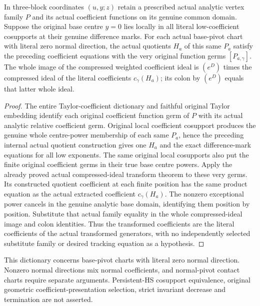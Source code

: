 \begin{theorem}
\label{hir:actual-coefficient-controlled-same-family-ideals}
\leanok
In three-block coordinates $(u,y;z)$ retain a prescribed actual analytic vertex family $P$ and its actual coefficient functions on its genuine common domain. Suppose the original base centre $y=0$ lies locally in all literal low-coefficient cosupports at their genuine difference marks. For each actual base-pivot chart with literal zero normal direction, the actual quotients $H_a$ of this same $P_a$ satisfy the preceding coefficient equations with the very original function germs $[P_{a,\gamma}]$.
The whole image of the compressed weighted coefficient ideal is $(e^D)$ times the compressed ideal of the literal coefficients $c_\gamma(H_a)$; its colon by $(e^D)$ equals that latter whole ideal.
\end{theorem}
\begin{proof}
The entire Taylor-coefficient dictionary and faithful original Taylor embedding identify each original coefficient function germ of $P$ with its actual analytic relative coefficient germ. Original local coefficient cosupport produces the genuine whole centre-power membership of each same $P_a$, hence the preceding internal actual quotient construction gives one $H_a$ and the exact difference-mark equations for all low exponents.
The same original local cosupports also put the finite original coefficient germs in their true base centre powers. Apply the already proved actual compressed-ideal transform theorem to these very germs. Its constructed quotient coefficient at each finite position has the same product equation as the actual extracted coefficient $c_\gamma(H_a)$. The nonzero exceptional power cancels in the genuine analytic base domain, identifying them position by position.
Substitute that actual family equality in the whole compressed-ideal image and colon identities. Thus the transformed coefficients are the literal coefficients of the actual transformed generators, with no independently selected substitute family or desired tracking equation as a hypothesis.
\end{proof}

\begin{remark}
This dictionary concerns base-pivot charts with literal zero normal direction. Nonzero normal directions mix normal coefficients, and normal-pivot contact charts require separate arguments. Persistent-HS cosupport equivalence, original geometric coefficient-presentation selection, strict invariant decrease and termination are not asserted.
\end{remark}
